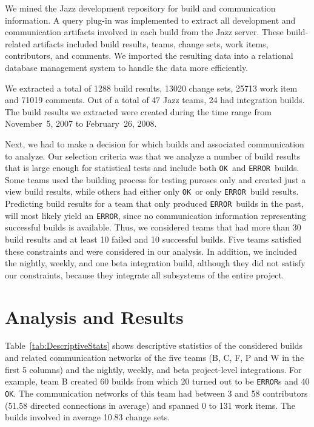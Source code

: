 \documentclass[12pt,oneside]{book}
\newcommand\error{\texttt{ERROR}}
\newcommand\ok{\texttt{OK}}
\begin{document}
We mined the Jazz development repository for build and communication information.
A query plug-in was implemented to extract all development and communication
artifacts involved in each build from the Jazz server. These build-related
artifacts included build results, teams, change sets, work items, contributors,
and comments. We imported the resulting data into a relational database
management system to handle the data more efficiently.

We extracted a total of 1288 build results, 13020 change sets, 25713 work item
and 71019 comments. Out of a total of 47 Jazz teams, 24 had integration builds.
The build results we extracted were created during the time range from
November~5, 2007 to February~26, 2008.

Next, we had to make a decision for which builds and associated communication to
analyze. Our selection criteria was that we analyze a number of build results
that is large enough for statistical tests and include both \ok\ and \error\
builds. Some teams used the building process for testing puroses only and created
just a view build results, while others had either only \ok\ or only \error\
build results. Predicting build results for a team that only produced \error\
builds in the past, will most likely yield an \error, since no communication
information representing successful builds is available. Thus, we considered
teams that had more than 30 build results and at least 10 failed and 10
successful builds. Five teams satisfied these constraints and were considered in
our analysis. In addition, we included the nightly, weekly, and one beta
integration build, although they did not satisfy our constraints, because 
they integrate all subsystems of the entire project.






\section{Analysis and Results}
\label{sec:AnalysisResults}
Table~\ref{tab:DescriptiveStats} shows descriptive statistics of the considered
builds and related communication networks of the five teams (B, C, F, P and W in
the first 5 columns) and the nightly, weekly, and beta project-level
integrations. For example, team B created 60 builds from which 20 turned out to
be \error s and 40 \ok. The communication networks of this team had between 3 and
58 contributors (51.58 directed connections in average) and spanned 0 to 131 work
items. The builds involved in average 10.83 change sets.
\end{document}
